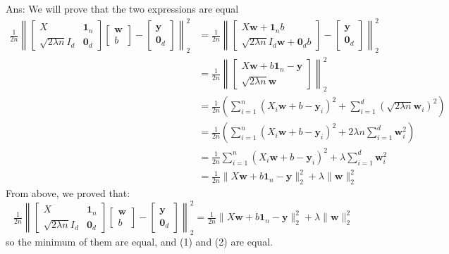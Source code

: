\documentclass[10pt,letter,notitlepage]{article}
\newcommand{\zero}{\mathbf{0}}
\newcommand{\one}{\mathbf{1}}
\newcommand{\wv}{\mathbf{w}}
\newcommand{\yv}{\mathbf{y}}
\newcommand{\ans}[1]{{\color{orange}\textsf{Ans}: #1}}
\newcounter{exercise}
\begin{document}
\begin{exercise}
\begin{enumerate}
    \ans{
      \color{orange}
      We will prove that the two expressions are equal
      \begin{align*}
          \tfrac{1}{2n} \left\|\begin{bmatrix}
          X & \one_n \\
          \sqrt{2\lambda n}I_d & \zero_d
          \end{bmatrix} \begin{bmatrix} \wv  \\ b\end{bmatrix}  - \begin{bmatrix}\yv \\ \zero_d\end{bmatrix}\right\|_2^2 
          &= 
          \tfrac{1}{2n} \left\|\begin{bmatrix}
          X\wv + \one_nb \\
          \sqrt{2\lambda n}I_d\wv + \zero_db
          \end{bmatrix} - \begin{bmatrix}\yv \\ \zero_d\end{bmatrix}\right\|_2^2 \\
          &=
          \tfrac{1}{2n} \left\|\begin{bmatrix}
          X\wv + b\one_n - \yv\\
          \sqrt{2\lambda n}\wv
          \end{bmatrix}\right\|_2^2 \\
          &=
          \tfrac{1}{2n} \left(\sum_{i=1}^n (X_i\wv + b - \yv_i)^2 + \sum_{i=1}^d (\sqrt{2\lambda n}\wv_i)^2 \right) \\
          &=
          \tfrac{1}{2n} \left(\sum_{i=1}^n (X_i\wv + b - \yv_i)^2 + 2\lambda n\sum_{i=1}^d \wv_i^2 \right) \\
          &=
          \tfrac{1}{2n} \sum_{i=1}^n (X_i\wv + b - \yv_i)^2 + \lambda \sum_{i=1}^d \wv_i^2 \\
          &=
          \tfrac{1}{2n} \|X \wv+ b\one_n - \yv\|_2^2 + \lambda \|\wv\|_2^2
      \end{align*}
      From above, we proved that:
      $$
        \tfrac{1}{2n} \left\|\begin{bmatrix}
        X & \one_n \\
        \sqrt{2\lambda n}I_d & \zero_d
        \end{bmatrix} \begin{bmatrix} \wv  \\ b\end{bmatrix}  - \begin{bmatrix}\yv \\ \zero_d\end{bmatrix}\right\|_2^2 
        =
        \tfrac{1}{2n} \|X \wv+ b\one_n - \yv\|_2^2 + \lambda \|\wv\|_2^2
      $$
      so the minimum of them are equal, and (1) and (2) are equal.
    }


\end{enumerate}
\end{exercise}
\end{document}
